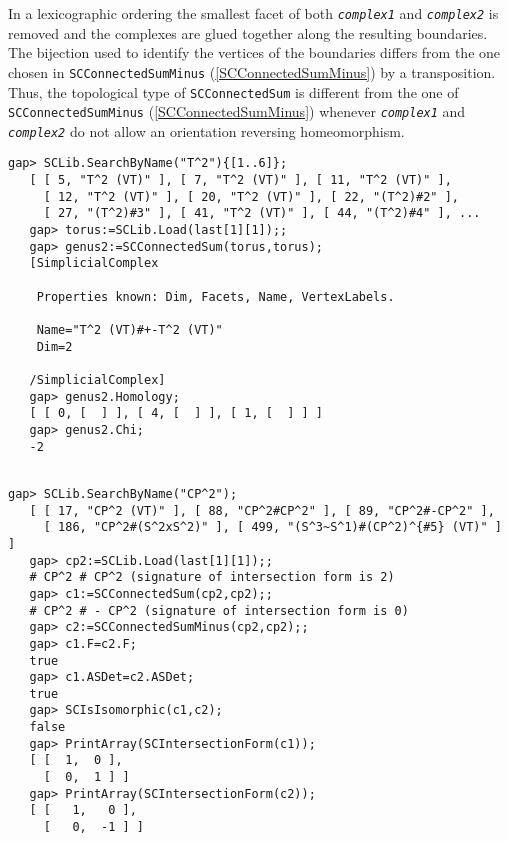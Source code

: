 \documentclass[a4paper,11pt]{report}
\begin{document}
{{{ In a lexicographic ordering the smallest facet of both \mbox{\texttt{\mdseries\slshape complex1}} and \mbox{\texttt{\mdseries\slshape complex2}} is removed and the complexes are glued together along the resulting
boundaries. The bijection used to identify the vertices of the boundaries
differs from the one chosen in \texttt{SCConnectedSumMinus} (\ref{SCConnectedSumMinus}) by a transposition. Thus, the topological type of \texttt{SCConnectedSum} is different from the one of \texttt{SCConnectedSumMinus} (\ref{SCConnectedSumMinus}) whenever \mbox{\texttt{\mdseries\slshape complex1}} and \mbox{\texttt{\mdseries\slshape complex2}} do not allow an orientation reversing homeomorphism. 
\begin{Verbatim}[commandchars=!@|,fontsize=\small,frame=single,label=Example]
   gap> SCLib.SearchByName("T^2"){[1..6]};
   [ [ 5, "T^2 (VT)" ], [ 7, "T^2 (VT)" ], [ 11, "T^2 (VT)" ], 
     [ 12, "T^2 (VT)" ], [ 20, "T^2 (VT)" ], [ 22, "(T^2)#2" ], 
     [ 27, "(T^2)#3" ], [ 41, "T^2 (VT)" ], [ 44, "(T^2)#4" ], ...
   gap> torus:=SCLib.Load(last[1][1]);;
   gap> genus2:=SCConnectedSum(torus,torus);
   [SimplicialComplex
   
    Properties known: Dim, Facets, Name, VertexLabels.
   
    Name="T^2 (VT)#+-T^2 (VT)"
    Dim=2
   
   /SimplicialComplex]
   gap> genus2.Homology;
   [ [ 0, [  ] ], [ 4, [  ] ], [ 1, [  ] ] ]
   gap> genus2.Chi;
   -2
   
\end{Verbatim}
 
\begin{Verbatim}[commandchars=!@|,fontsize=\small,frame=single,label=Example]
   gap> SCLib.SearchByName("CP^2");
   [ [ 17, "CP^2 (VT)" ], [ 88, "CP^2#CP^2" ], [ 89, "CP^2#-CP^2" ], 
     [ 186, "CP^2#(S^2xS^2)" ], [ 499, "(S^3~S^1)#(CP^2)^{#5} (VT)" ] ]
   gap> cp2:=SCLib.Load(last[1][1]);;
   # CP^2 # CP^2 (signature of intersection form is 2)  
   gap> c1:=SCConnectedSum(cp2,cp2);;
   # CP^2 # - CP^2 (signature of intersection form is 0)
   gap> c2:=SCConnectedSumMinus(cp2,cp2);;
   gap> c1.F=c2.F;
   true
   gap> c1.ASDet=c2.ASDet;
   true
   gap> SCIsIsomorphic(c1,c2);
   false
   gap> PrintArray(SCIntersectionForm(c1));
   [ [  1,  0 ],
     [  0,  1 ] ]
   gap> PrintArray(SCIntersectionForm(c2));
   [ [   1,   0 ],
     [   0,  -1 ] ]
   
\end{Verbatim}
 }

 

}}
\end{document}
